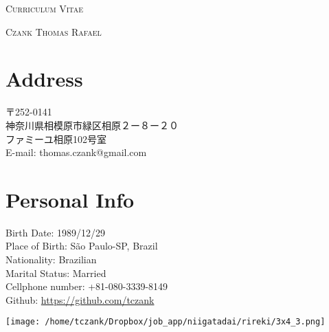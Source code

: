 \documentclass[a4paper]{article}
\begin{document}
\pagestyle{empty}

\begin{center}
\huge{\textsc{Curriculum Vitae}}
\vspace{\baselineskip}

\Large{\textsc{Czank Thomas Rafael}}
\end{center}
\vspace{1.5\baselineskip}

\section{Address}
\begin{CJK}{UTF8}{ipxm}
  \begin{flushleft}
〒252-0141 　\\
神奈川県相模原市緑区相原２ー８ー２０ \\
ファミーユ相原102号室 \\
E-mail: thomas.czank@gmail.com\\
\end{flushleft}
\end{CJK}

\section{Personal Info}
\begin{minipage}{0.5\textwidth}
\begin{flushleft}
  Birth Date: 1989/12/29  \\
  Place of Birth: São Paulo-SP, Brazil \\
  Nationality: Brazilian \\
  Marital Status: Married\\
  Cellphone number: +81-080-3339-8149\\
  Github: \url{https://github.com/tczank}
\end{flushleft}
\end{minipage}
\hfill
\begin{minipage}{0.5\textwidth}
\begin{flushright}
\hspace*{-2cm}
\texttt{[image: /home/tczank/Dropbox/job\_app/niigatadai/rireki/3x4\_3.png]}
\end{flushright}
\end{minipage}
\end{document}
